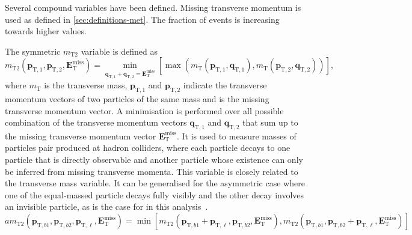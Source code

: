 %    

Several compound variables have been defined. Missing transverse momentum is used
as defined in \cref{sec:definitions-met}. The fraction of \tW events is increasing
towards higher values.

The symmetric \(m_{\mathrm{T}2}\) variable is defined as
\begin{equation}
  m_{\mathrm{T}2}(\mathbf{p}_{\mathrm{T},1}, \mathbf{p}_{\mathrm{T},2},\mathbf{E}_{\mathrm{T}}^{\mathrm{miss}}) = \min_{{ \mathbf{q}_{\mathrm{T},1}+\mathbf{q}_{\mathrm{T},2}=\mathbf{E}_{\mathrm{T}}^{\mathrm{miss}}}}[\max(m_{\mathrm{T}}(\mathbf{p}_{\mathrm{T},1},\mathbf{q}_{\mathrm{T},1}),m_{\mathrm{T}}(\mathbf{p}_{\mathrm{T},2},\mathbf{q}_{\mathrm{T},2}))],
\end{equation}
where \(m_{\mathrm{T}}\) is the transverse mass, \(\mathbf{p}_{\mathrm{T},1}\) and  \(\mathbf{p}_{\mathrm{T},2}\) indicate the transverse momentum vectors of two particles of the same mass and \met is the missing transverse momentum vector.
A minimisation is performed over all possible combination of the transverse momentum vectors \(\mathbf{q}_{\mathrm{T},1}\) and \(\mathbf{q}_{\mathrm{T},2}\) that sum up to the missing transverse momentum vector \(\mathbf{E}_{\mathrm{T}}^{\mathrm{miss}}\).
It is used to measure masses of particles pair produced at hadron colliders,
where each particle decays to one particle that is directly observable and another
particle whose existence can only be inferred from missing transverse momenta.
This variable is closely related to the transverse mass variable.
It can be generalised for the asymmetric case where one of the equal-massed particle decays fully visibly
and the other decay involves an invisible particle, as is the case for \ttbar in this analysis~\cite{Lester:2014yga}.
\begin{equation}
  am_{\mathrm{T}2}(\mathbf{p}_{\mathrm{T},b1}, \mathbf{p}_{\mathrm{T},b2},\mathbf{p}_{\mathrm{T},\ell},\mathbf{E}_{\mathrm{T}}^{\mathrm{miss}}) = \min[m_{\mathrm{T}2}(\mathbf{p}_{\mathrm{T},b1}+\mathbf{p}_{\mathrm{T},\ell}, \mathbf{p}_{\mathrm{T},b2},\mathbf{E}_{\mathrm{T}}^{\mathrm{miss}}),m_{\mathrm{T}2}(\mathbf{p}_{\mathrm{T},b1}, \mathbf{p}_{\mathrm{T},b2}+\mathbf{p}_{\mathrm{T},\ell},\mathbf{E}_{\mathrm{T}}^{\mathrm{miss}})]
\end{equation}

